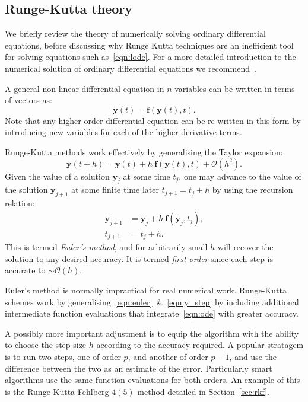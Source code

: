 \subsection{Runge-Kutta theory}
\label{sec:rk}
We briefly review the theory of numerically solving ordinary differential equations, before discussing why Runge Kutta techniques are an inefficient tool for solving equations such as~\eqref{eqn:lode}.
For a more detailed introduction to the numerical solution of ordinary differential equations we recommend~\cite{Press+2007}.

A general non-linear differential equation in $n$ variables can be written in terms of vectors as:
\begin{equation}
  \dot{\mathbf{y}}(t) = \mathbf{f}(\mathbf{y}(t),t).
  \label{eqn:ode}
\end{equation}
Note that any higher order differential equation can be re-written in this form by introducing new variables for each of the higher derivative terms.

Runge-Kutta methods work effectively by generalising the Taylor expansion:
\begin{equation}
  \mathbf{y}(t+h)  = \mathbf{y}(t) + h\:\mathbf{f}(\mathbf{y}(t),t) + \mathcal{O}(h^2).
  \label{eqn:euler}
\end{equation}
Given the value of a solution $\mathbf{y}_j$ at some time $t_j$, one may advance to the value of the solution $\mathbf{y}_{j+1}$ at some finite time later $t_{j+1} = t_j + h$ by using the recursion relation:
\begin{align}
  \mathbf{y}_{j+1} &=  \mathbf{y}_{j} + h\:\mathbf{f}(\mathbf{y}_j,t_j),
  \label{eqn:y_step}\\
  t_{j+1} &=  t_{j} + h.
  \label{eqn:t_step}
\end{align}
This is termed {\em Euler's method}, and for arbitrarily small $h$ will recover the solution to any desired accuracy. It is termed {\em first order\/} since each step is accurate to $\sim \mathcal{O}(h)$.

Euler's method is normally impractical for real numerical work. Runge-Kutta schemes work by generalising~\eqref{eqn:euler}~\&~\eqref{eqn:y_step} by including additional intermediate function evaluations that integrate~\eqref{eqn:ode} with greater accuracy.

A possibly more important adjustment is to equip the algorithm with the ability to choose the step size $h$ according to the accuracy required. A popular stratagem is to run two steps, one of order $p$, and another of order $p-1$, and use the difference between the two as an estimate of the error. Particularly smart algorithms use the same function evaluations for both orders. An example of this is the Runge-Kutta-Fehlberg $4(5)$ method detailed in Section~\ref{sec:rkf}.

